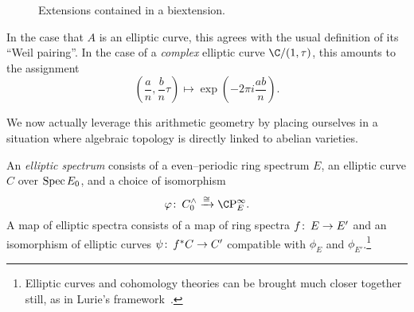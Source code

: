 \begin{figure}
\begin{center}
\hspace{0.5em}
\end{center}
\caption{Extensions contained in a biextension.}
\end{figure}

\begin{remark}
In the case that \(A\) is an elliptic curve, this agrees with the usual definition of its ``Weil pairing''.  In the case of a \emph{complex} elliptic curve \(\C / (1, \tau)\), this amounts to the assignment \[\left( \frac{a}{n}, \frac{b}{n} \tau \right) \mapsto \exp\left(-2\pi i \frac{ab}{n}\right).\]
\end{remark}

We now actually leverage this arithmetic geometry by placing ourselves in a situation where algebraic topology is directly linked to abelian varieties.

\begin{definition}\label{DefnEllipticSpectrum}
An \textit{elliptic spectrum} consists of a even--periodic ring spectrum \(E\), an elliptic curve \(C\) over \(\operatorname{Spec} E_0\), and a choice of isomorphism \[\phi\co C^\wedge_0 \xrightarrow{\cong} \CP^\infty_E.\]  A map of elliptic spectra consists of a map of ring spectra \(f\colon\thinspace E \to E'\) and an isomorphism of elliptic curves \(\psi\colon\thinspace f^* C \to C'\) compatible with \(\phi_E\) and \(\phi_{E'}\).\footnote{Elliptic curves and cohomology theories can be brought much closer together still, as in Lurie's framework~\cite[Sections 4 and 5.3]{LurieSurveyOfEll}.}
\end{definition}

